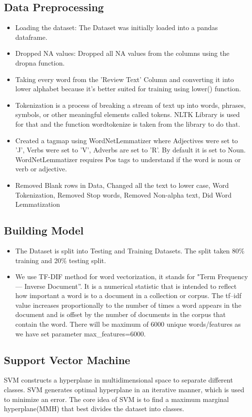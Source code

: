 \documentclass{article}
\begin{document}
\subsection{Data Preprocessing}
\begin{itemize}
  \item Loading the dataset: The Dataset was initially loaded into a pandas dataframe.
  \item Dropped NA values: Dropped all NA values from the columns using the dropna function.
  \item Taking every word from the 'Review Text' Column and converting it into lower alphabet because it's better suited for training using lower() function.
  \item Tokenization is a process of breaking a stream of text up into words, phrases, symbols, or other meaningful elements called tokens. NLTK Library is used for that and the function wordtokenize is taken from the library to do that.
 \item Created a tagmap using WordNetLemmatizer where Adjectives were set to 'J', Verbs were set to 'V', Adverbs are set to 'R'. By default it is set to Noun. WordNetLemmatizer requires Pos tags to understand if the word is noun or verb or adjective.
 \item  Removed Blank rows in Data, Changed all the text to lower case, Word Tokenization, Removed Stop words, Removed Non-alpha text, Did Word Lemmatization
\end{itemize}

\subsection{Building Model}
\begin{itemize}
  \item The Dataset is split into Testing and Training Datasets. The split taken 80\% training and 20\% testing split.
  \item We use TF-DIF method for word vectorization, it stands for "Term Frequency — Inverse Document”. It is a numerical statistic that is intended to reflect how important a word is to a document in a collection or corpus. The tf–idf value increases proportionally to the number of times a word appears in the document and is offset by the number of documents in the corpus that contain the word. There will be maximum of 6000 unique words/features as we have set parameter max\_features=6000.
\end{itemize}
\subsection{Support Vector Machine}
SVM constructs a hyperplane in multidimensional space to separate different classes. SVM generates optimal hyperplane in an iterative manner, which is used to minimize an error. The core idea of SVM is to find a maximum marginal hyperplane(MMH) that best divides the dataset into classes.
\end{document}
